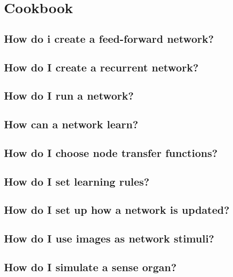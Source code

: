 \documentclass[11pt,letterpaper]{memoir}
\begin{document}
\chapter{Cookbook}
\label{chap:cookbook}

\section{How do i create a feed-forward network?}
\label{sec:feed-forward}

\section{How do I create a recurrent network?}
\label{sec:recurrent}

\section{How do I run a network?}
\label{sec:running-network}

\section{How can a network learn?}
\label{sec:learning}

\section{How do I choose node transfer functions?}
\label{sec:transfer-functions}

\section{How do I set learning rules?}
\label{sec:learning-rules}

\section{How do I set up how a network is updated?}
\label{sec:spreading}

\section{How do I use images as network stimuli?}
\label{sec:images}

\section{How do I simulate a sense organ?}
\label{sec:sense-organ}
\end{document}
